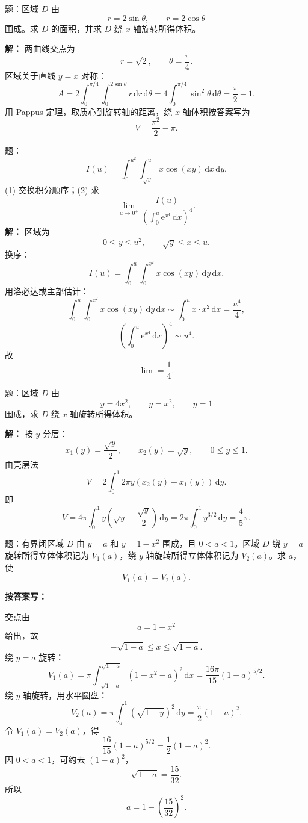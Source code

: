 \documentclass[11pt,a4paper,UTF8]{ctexart}
\newcommand{\dd}{\,\mathrm d}
\newcommand{\ee}{\mathrm e}
\begin{document}
\begin{answerbox}[2021--2022 大题：极坐标区域面积与旋转体体积]
题：区域 \(D\) 由
\[
r=2\sin\theta,\qquad r=2\cos\theta
\]
围成。求 \(D\) 的面积，并求 \(D\) 绕 \(x\) 轴旋转所得体积。

\textbf{解：}
两曲线交点为
\[
r=\sqrt2,\qquad \theta=\frac\pi4.
\]
区域关于直线 \(y=x\) 对称：
\[
A=2\int_0^{\pi/4}\int_0^{2\sin\theta}r\dd r\dd\theta
=4\int_0^{\pi/4}\sin^2\theta\dd\theta
=\boxed{\frac\pi2-1}.
\]
用 Pappus 定理，取质心到旋转轴的距离，绕 \(x\) 轴体积按答案写为
\[
\boxed{V=\frac{\pi^2}{2}-\pi}.
\]
\end{answerbox}

\begin{answerbox}[2021--2022 大题：二重积分换序与极限]
题：
\[
I(u)=\int_0^{u^2}\int_{\sqrt y}^{u}x\cos(xy)\dd x\dd y.
\]
(1) 交换积分顺序；(2) 求
\[
\lim_{u\to0^+}\frac{I(u)}
{\left(\int_0^u\ee^{x^4}\dd x\right)^4}.
\]
\textbf{解：}
区域为
\[
0\le y\le u^2,\qquad \sqrt y\le x\le u.
\]
换序：
\[
\boxed{I(u)=\int_0^u\int_0^{x^2}x\cos(xy)\dd y\dd x}.
\]
用洛必达或主部估计：
\[
\int_0^u\int_0^{x^2}x\cos(xy)\dd y\dd x
\sim \int_0^u x\cdot x^2\dd x=\frac{u^4}{4},
\]
\[
\left(\int_0^u\ee^{x^4}\dd x\right)^4\sim u^4.
\]
故
\[
\boxed{\lim=\frac14}.
\]
\end{answerbox}

\begin{answerbox}[2022--2023 大题：旋转体体积]
题：区域 \(D\) 由
\[
y=4x^2,\qquad y=x^2,\qquad y=1
\]
围成，求 \(D\) 绕 \(x\) 轴旋转所得体积。

\textbf{解：}
按 \(y\) 分层：
\[
x_1(y)=\frac{\sqrt y}{2},\qquad x_2(y)=\sqrt y,\qquad 0\le y\le1.
\]
由壳层法
\[
V=2\int_0^1 2\pi y\left(x_2(y)-x_1(y)\right)\dd y.
\]
即
\[
V=4\pi\int_0^1y\left(\sqrt y-\frac{\sqrt y}{2}\right)\dd y
=2\pi\int_0^1y^{3/2}\dd y
=\boxed{\frac45\pi}.
\]
\end{answerbox}

\begin{answerbox}
题：有界闭区域 \(D\) 由 \(y=a\) 和 \(y=1-x^2\) 围成，且 \(0<a<1\)。区域 \(D\) 绕 \(y=a\) 旋转所得立体体积记为 \(V_1(a)\)，绕 \(y\) 轴旋转所得立体体积记为 \(V_2(a)\)。求 \(a\)，使
\[
V_1(a)=V_2(a).
\]

\textbf{按答案写：}

交点由
\[
a=1-x^2
\]
给出，故
\[
-\sqrt{1-a}\le x\le \sqrt{1-a}.
\]
绕 \(y=a\) 旋转：
\[
V_1(a)=\pi\int_{-\sqrt{1-a}}^{\sqrt{1-a}}
(1-x^2-a)^2\dd x
=\frac{16\pi}{15}(1-a)^{5/2}.
\]
绕 \(y\) 轴旋转，用水平圆盘：
\[
V_2(a)=\pi\int_a^1(\sqrt{1-y})^2\dd y
=\frac{\pi}{2}(1-a)^2.
\]
令 \(V_1(a)=V_2(a)\)，得
\[
\frac{16}{15}(1-a)^{5/2}=\frac12(1-a)^2.
\]
因 \(0<a<1\)，可约去 \((1-a)^2\)，
\[
\sqrt{1-a}=\frac{15}{32}.
\]
所以
\[
\boxed{a=1-\left(\frac{15}{32}\right)^2}.
\]
\end{answerbox}
\end{document}
